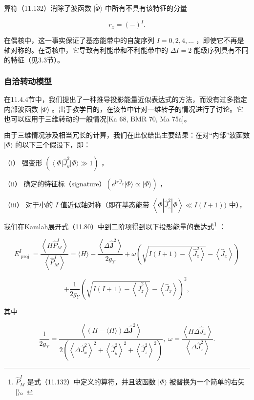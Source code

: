 算符（11.132）消除了波函数 $|\widetilde{\Phi}\rangle$ 中所有不具有该特征的分量

\[
{r}_{x}={\left(-\right)}^{I}.\tag{11.133}
\]

在偶核中，这一事实保证了基态能带中的自旋序列 $I=0,2,4,\ldots$ ，即使它不再是轴对称的。在奇核中，它导致有利能带和不利能带中的
${\Delta I}=2$ 能级序列具有不同的特征（见3.3节）。

\subsubsection{自洽转动模型}

在11.4.4节中，我们提出了一种推导投影能量近似表达式的方法，而没有过多指定内部波函数 $|\Phi\rangle$ 。出于教学目的，在该节中针对一维转子的情况进行了讨论。它也可以应用于三维转动的一般情况{[}Ka
68, BMR 70, Ma 75a{]}。

由于三维情况涉及相当冗长的计算，我们在此仅给出主要结果：在对“内部”波函数 $|\Phi\rangle$ 的以下三个假设下，即：

（i） 强变形 $\left({\left\langle \Phi\right|{\widehat{J}}^{2}_{y}|\Phi\rangle\gg1}\right)$
，

（ii） 确定的特征标（signature）$(e^{\mathrm{i}\pi\widehat{J}_{x}}|\Phi\rangle\propto|\Phi\rangle)$
，

（iii） 对于小的 $I$ 值近似轴对称（即在基态能带 $\left\langle {\Phi\left|{\widehat{J}}^{2}_{z}\right|\Phi}\right\rangle \ll I\left({I+1}\right))$
中），

我们在Kamlah展开式（11.80）中到二阶项得到以下投影能量的表达式\footnote{$\hat{P}^{I}_{M}$ 是式（11.132）中定义的算符，并且波函数 $|\Phi\rangle$ 被替换为一个简单的右矢
$|\rangle$。} \cite{BMR70}：

\[
{E}^{I}_{\text{ proj }}=\frac{\left\langle H{\widehat{P}}^{I}_{M}\right\rangle }{\left\langle {\widehat{P}}^{I}_{M}\right\rangle }=\langle H\rangle-\frac{\left\langle \Delta{\widehat{\boldsymbol{J}}}^{2}\right\rangle }{2{g}_{Y}}+\omega\left({\sqrt{I\left({I+1}\right)-\left\langle {\widehat{J}}^{2}_{z}\right\rangle }-\left\langle {\widehat{J}}_{x}\right\rangle }\right)
\]

\[
+\frac{1}{2{g}_{Y}}{\left(\sqrt{I\left({I+1}\right)-\left\langle {\widehat{J}}^{2}_{z}\right\rangle }-\left\langle {\widehat{J}}_{x}\right\rangle \right)}^{2},\tag{11.134}
\]

其中

\[
\frac{1}{2{g}_{Y}}=\frac{\left\langle \left(H-\langle H\rangle\right)\Delta{\widehat{\boldsymbol{J}}}^{2}\right\rangle }{2\left({{\left\langle \Delta{\widehat{J}}^{2}_{x}\right\rangle }^{2}+{\left\langle {\widehat{J}}^{2}_{y}\right\rangle }^{2}+{\left\langle {\widehat{J}}^{2}_{z}\right\rangle }^{2}}\right)},\;\omega=\frac{\left\langle H\Delta{\widehat{J}}_{x}\right\rangle }{\left\langle \Delta{\widehat{J}}^{2}_{x}\right\rangle }.
\]

